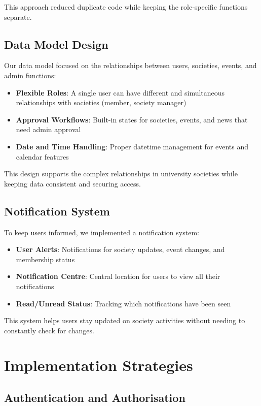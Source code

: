 This approach reduced duplicate code while keeping the role-specific functions separate.

\subsection{Data Model Design}

Our data model focused on the relationships between users, societies, events, and admin functions:

\begin{itemize}
    \item \textbf{Flexible Roles}: A single user can have different and simultaneous relationships with societies (member, society manager)
    \item \textbf{Approval Workflows}: Built-in states for societies, events, and news that need admin approval
    \item \textbf{Date and Time Handling}: Proper datetime management for events and calendar features
\end{itemize}

This design supports the complex relationships in university societies while keeping data consistent and securing access.

\subsection{Notification System}

To keep users informed, we implemented a notification system:

\begin{itemize}
    \item \textbf{User Alerts}: Notifications for society updates, event changes, and membership status
    \item \textbf{Notification Centre}: Central location for users to view all their notifications
    \item \textbf{Read/Unread Status}: Tracking which notifications have been seen
\end{itemize}

This system helps users stay updated on society activities without needing to constantly check for changes.

\section{Implementation Strategies}

\subsection{Authentication and Authorisation}

